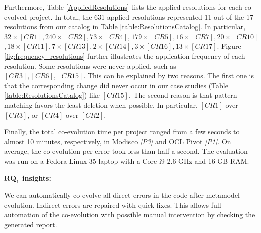 	Furthermore, Table \ref{AppliedResolutions} lists the applied resolutions for each co-evolved project. In total, the 631 applied resolutions represented 11 out of the 17 resolutions from our catalog in Table \ref{table:ResolutionsCatalog}. 
	In particular, $32 \times [CR1], 240 \times [CR2], 73 \times [CR4], 179 \times [CR5], 16 \times [CR7], 20 \times [CR10]$ $, 18 \times [CR11], 7 \times [CR13], 2 \times [CR14], 3 \times [CR16], 13 \times [CR17]$. 
	Figure \ref{fig:frequency_resolutions} further illustrates the application frequency of each resolution. Some resolutions were never applied, such as $[CR3], [CR6], [CR15]$. This can be explained by two reasons. The first one is that the corresponding change did never occur in our case studies (Table \ref{table:ResolutionsCatalog}) like $[CR15]$. The second reason is that pattern matching favors the least deletion when possible. In particular, $[CR1]$ over $[CR3]$, or $[CR4]$ over $[CR2]$.
	
	
	Finally, the total co-evolution time per project ranged from a few seconds to almost 10 minutes, respectively, in Modisco  \emph{[P3]} and OCL Pivot \emph{[P1]}. On average, the co-evolution per error took less than half a second. The evaluation was run on a Fedora Linux 35 laptop with a Core i9 2.6 GHz and 16 GB RAM.
	
	
	\begin{tcolorbox}[boxsep=-2pt]
	\textbf{$\boldsymbol{RQ_1}$ insights:}
	
	We can automatically co-evolve all direct errors in the code after metamodel evolution. Indirect errors are repaired with quick fixes. This allows full automation of the co-evolution with possible manual intervention by checking the generated report.
	
	\end{tcolorbox}
	
